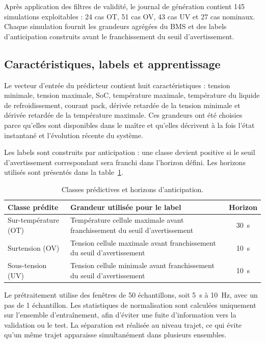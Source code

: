 \noindent
Après application des filtres de validité, le journal de génération contient 145 simulations exploitables : 24 cas OT, 51 cas OV, 43 cas UV et 27 cas nominaux. Chaque simulation fournit les grandeurs agrégées du BMS et des labels d'anticipation construits avant le franchissement du seuil d'avertissement.

\subsection{Caractéristiques, labels et apprentissage}
\label{subsec:ch4_variables_prediction}

Le vecteur d'entrée du prédicteur contient huit caractéristiques : tension minimale, tension maximale, SoC, température maximale, température du liquide de refroidissement, courant pack, dérivée retardée de la tension minimale et dérivée retardée de la température maximale. Ces grandeurs ont été choisies parce qu'elles sont disponibles dans le maître et qu'elles décrivent à la fois l'état instantané et l'évolution récente du système.

\noindent
Les labels sont construits par anticipation : une classe devient positive si le seuil d'avertissement correspondant sera franchi dans l'horizon défini. Les horizons utilisés sont présentés dans la table~\ref{tab:ch4_horizons_prediction}.

\begin{table}[H]
  \centering
  \small
  \begin{tabularx}{\textwidth}{|l|X|c|}
    \hline
    \textbf{Classe prédite} & \textbf{Grandeur utilisée pour le label} & \textbf{Horizon} \\
    \hline
    Sur-température (OT) & Température cellule maximale avant franchissement du seuil d'avertissement & 30~s \\
    \hline
    Surtension (OV) & Tension cellule maximale avant franchissement du seuil d'avertissement & 10~s \\
    \hline
    Sous-tension (UV) & Tension cellule minimale avant franchissement du seuil d'avertissement & 10~s \\
    \hline
  \end{tabularx}
  \captionsetup{width=0.82\textwidth, skip=15pt}
  \caption{Classes prédictives et horizons d'anticipation.}
  \label{tab:ch4_horizons_prediction}
\end{table}

\noindent
Le prétraitement utilise des fenêtres de 50 échantillons, soit 5~s à 10~Hz, avec un pas de 1 échantillon. Les statistiques de normalisation sont calculées uniquement sur l'ensemble d'entraînement, afin d'éviter une fuite d'information vers la validation ou le test. La séparation est réalisée au niveau trajet, ce qui évite qu'un même trajet apparaisse simultanément dans plusieurs ensembles.

